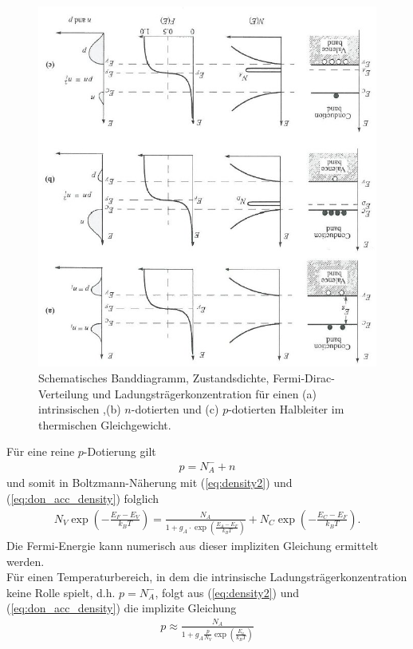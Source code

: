 \documentclass[a4paper,12pt]{article}
\begin{document}
\begin{figure}
\centering
\includegraphics[angle=180,scale=0.9]{Fermi_dot.jpeg}
\caption{Schematisches Banddiagramm, Zustandsdichte, Fermi-Dirac-Verteilung und Ladungsträgerkonzentration für einen (a) intrinsischen ,(b) $n$-dotierten und (c) $p$-dotierten Halbleiter im thermischen Gleichgewicht. \cite{lit:Sze07}}
\label{fig:fermi_dot}
\end{figure}
Für eine reine $p$-Dotierung gilt
\begin{align}
p=N_A^{-}+n
\end{align}
und somit in Boltzmann-Näherung mit (\ref{eq:density2}) und (\ref{eq:don_acc_density}) folglich
\begin{align}
N_V\exp\left(-\frac{E_F-E_V}{k_B T}\right)=\frac{N_A}{1+g_A\cdot\exp\left(\frac{E_A-E_F}{k_B T}\right)}+N_C\exp\left(-\frac{E_C-E_F}{k_B T}\right).
\end{align}
Die Fermi-Energie kann numerisch aus dieser impliziten Gleichung ermittelt werden.\\
Für einen Temperaturbereich, in dem die intrinsische Ladungsträgerkonzentration keine Rolle spielt, d.h. $p=N_A^{-}$, folgt aus (\ref{eq:density2}) und (\ref{eq:don_acc_density}) die implizite Gleichung
\begin{align}
p\approx\frac{N_A}{1+g_A\frac{p}{N_V}\exp\left(\frac{E_a}{k_B T}\right)}
\end{align}
\end{document}
